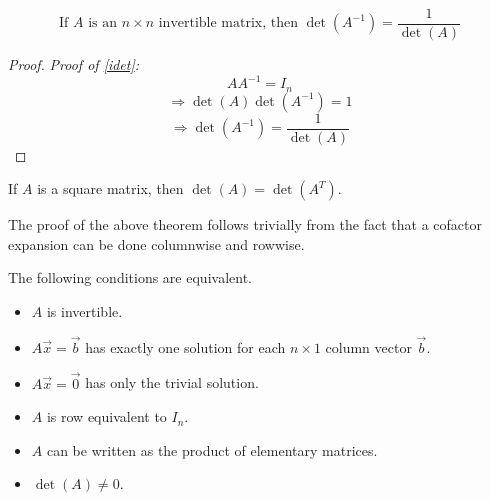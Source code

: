 \begin{theorem}\label{idet}
    \[\text{If }A\text{ is an }n\times n\text{ invertible matrix, then }\det \left( A^{-1}  \right) =\frac{1}{\det (A)}\]
\end{theorem}
\begin{proof}
    \emph{Proof of \ref{idet}:}
    \[
        AA^{-1} =I_n
    \]
    \[
        \Longrightarrow \det (A)\det \left( A^{-1}  \right) =1
    \]
    \[
        \Longrightarrow \det \left( A^{-1}  \right) =\frac{1}{\det (A)}
    \]
\end{proof}
\begin{theorem}
    If \(A\) is a square matrix, then \(\det (A)=\det \left( A^T \right) \).
\end{theorem}
The proof of the above theorem follows trivially from the fact that a cofactor expansion can be done columnwise and rowwise.
\begin{theorem}
    The following conditions are equivalent. 
    \begin{itemize}
        \item \(A\) is invertible. 
        \item \(A\vec{x}=\vec{b}\) has exactly one solution for each \(n\times 1\) column vector \(\vec{b}\).
        \item \(A\vec{x}=\vec{0}\) has only the trivial solution. 
        \item \(A\) is row equivalent to \(I_n\). 
        \item \(A\) can be written as the product of elementary matrices. 
        \item \(\det (A)\neq 0\).
    \end{itemize}
\end{theorem}
